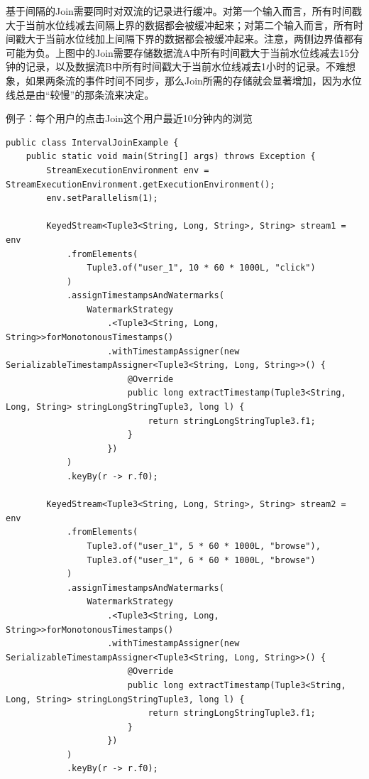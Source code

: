 \documentclass[cn,11pt,chinese]{elegantbook}
\begin{document}
基于间隔的Join需要同时对双流的记录进行缓冲。对第一个输入而言，所有时间戳大于当前水位线减去间隔上界的数据都会被缓冲起来；对第二个输入而言，所有时间戳大于当前水位线加上间隔下界的数据都会被缓冲起来。注意，两侧边界值都有可能为负。上图中的Join需要存储数据流A中所有时间戳大于当前水位线减去15分钟的记录，以及数据流B中所有时间戳大于当前水位线减去1小时的记录。不难想象，如果两条流的事件时间不同步，那么Join所需的存储就会显著增加，因为水位线总是由“较慢”的那条流来决定。

例子：每个用户的点击Join这个用户最近10分钟内的浏览

\begin{verbatim}
public class IntervalJoinExample {
    public static void main(String[] args) throws Exception {
        StreamExecutionEnvironment env = StreamExecutionEnvironment.getExecutionEnvironment();
        env.setParallelism(1);

        KeyedStream<Tuple3<String, Long, String>, String> stream1 = env
            .fromElements(
                Tuple3.of("user_1", 10 * 60 * 1000L, "click")
            )
            .assignTimestampsAndWatermarks(
                WatermarkStrategy
                    .<Tuple3<String, Long, String>>forMonotonousTimestamps()
                    .withTimestampAssigner(new SerializableTimestampAssigner<Tuple3<String, Long, String>>() {
                        @Override
                        public long extractTimestamp(Tuple3<String, Long, String> stringLongStringTuple3, long l) {
                            return stringLongStringTuple3.f1;
                        }
                    })
            )
            .keyBy(r -> r.f0);

        KeyedStream<Tuple3<String, Long, String>, String> stream2 = env
            .fromElements(
                Tuple3.of("user_1", 5 * 60 * 1000L, "browse"),
                Tuple3.of("user_1", 6 * 60 * 1000L, "browse")
            )
            .assignTimestampsAndWatermarks(
                WatermarkStrategy
                    .<Tuple3<String, Long, String>>forMonotonousTimestamps()
                    .withTimestampAssigner(new SerializableTimestampAssigner<Tuple3<String, Long, String>>() {
                        @Override
                        public long extractTimestamp(Tuple3<String, Long, String> stringLongStringTuple3, long l) {
                            return stringLongStringTuple3.f1;
                        }
                    })
            )
            .keyBy(r -> r.f0);


\end{verbatim}
\end{document}
